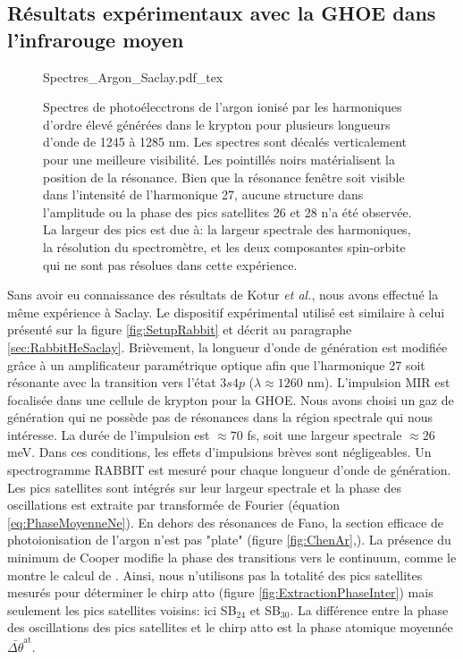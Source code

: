\subsection{Résultats expérimentaux avec la GHOE dans l'infrarouge moyen}
\begin{figure}[ht]
\centering
\def\svgwidth{1\textwidth}
{Spectres_Argon_Saclay.pdf_tex}
\caption{Spectres de photoélecctrons de l'argon ionisé par les harmoniques d'ordre élevé générées dans le krypton pour plusieurs longueurs d'onde de 1245 à 1285 nm. Les spectres sont décalés verticalement pour une meilleure visibilité. Les pointillés noirs matérialisent la position de la résonance. Bien que la résonance fenêtre soit visible dans l'intensité de l'harmonique 27, aucune structure dans l'amplitude ou la phase des pics satellites 26 et 28 n'a été observée. La largeur des pics est due à: la largeur spectrale des harmoniques, la résolution du spectromètre, et les deux composantes spin-orbite qui ne sont pas résolues dans cette expérience.}
\label{fig:Spectres_Argon_Saclay}
\end{figure}

Sans avoir eu connaissance des résultats de Kotur \textit{et al.}, nous avons effectué la même expérience à Saclay. Le dispositif expérimental utilisé est similaire à celui présenté sur la figure \ref{fig:SetupRabbit} et décrit au paragraphe \ref{sec:RabbitHeSaclay}. Brièvement, la longueur d'onde de génération est modifiée grâce à un amplificateur paramétrique optique afin que l'harmonique 27 soit résonante avec la transition vers l'état $3s4p$ ($\lambda \approx 1260$ nm). L'impulsion MIR est focalisée dans une cellule de krypton pour la GHOE. Nous avons choisi un gaz de génération qui ne possède pas de résonances dans la région spectrale qui nous intéresse.  La durée de l'impulsion est $\approx 70$ fs, soit une largeur spectrale $\approx 26$ meV. Dans ces conditions, les effets d'impulsions brèves sont négligeables. Un spectrogramme RABBIT est mesuré pour chaque longueur d'onde de génération. Les pics satellites sont intégrés sur leur largeur spectrale et la phase des oscillations est extraite par transformée de Fourier (équation \ref{eq:PhaseMoyenneNe}). En dehors des résonances de Fano, la section efficace de photoionisation de l'argon n'est pas "plate" (figure \ref{fig:ChenAr},). La présence du minimum de Cooper  modifie la phase des transitions vers le continuum, comme le montre le calcul de . Ainsi, nous n'utilisons pas la totalité des pics satellites mesurés pour déterminer le chirp atto (figure \ref{fig:ExtractionPhaseInter}) mais seulement les pics satellites voisins: ici SB$_{24}$ et SB$_{30}$. La différence entre la phase des oscillations des pics satellites et le chirp atto est la phase atomique moyennée $\bar{\Delta \theta}^{\text{at}}$.

